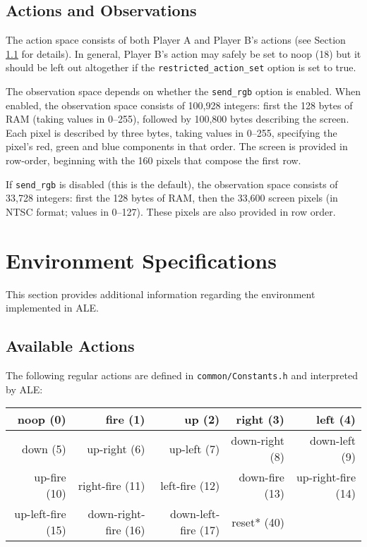 \documentclass[12pt]{article}
\begin{document}
\subsection{Actions and Observations}

The action space consists of both Player A and Player B's actions (see Section 
\ref{sec:available_actions}
for details). In general, Player B's action may safely be set to noop (18) but it should be left out
altogether if the \verb+restricted_action_set+ option is set to true. 

The observation space depends on whether the \verb+send_rgb+ option is enabled. 
 When enabled, the observation space consists of 100,928 
 integers: first the 128 bytes of RAM (taking values in 0--255), followed by 100,800 bytes 
 describing the screen.
 Each pixel is described by three bytes, taking values in 0--255, specifying the pixel's 
 red, green and blue components in that order. The screen is provided in row-order, 
beginning with the 160 pixels that compose the first row.
 
If \verb+send_rgb+ is disabled (this is the default), the observation space consists of 33,728 integers: first the 128 bytes of RAM, then the 33,600 screen pixels (in NTSC format; values in 0--127).
These pixels are also provided in row order.

\section{Environment Specifications}\label{sec:environment_specifications}

This section provides additional information regarding the environment implemented in ALE.

\subsection{Available Actions}\label{sec:available_actions}

The following regular actions are defined in \verb+common/Constants.h+ and interpreted by ALE:

\begin{center}
\small{
\begin{tabular}{|r|r|r|r|r|}
\hline
noop (0) & fire (1) & up (2) & right (3) & left (4) \\
\hline
down (5) & up-right (6) & up-left (7) & down-right (8) & down-left (9) \\
\hline
up-fire (10) & right-fire (11) & left-fire (12) & down-fire (13) & up-right-fire (14) \\
\hline
up-left-fire (15) & down-right-fire (16) & down-left-fire (17) & reset* (40) & \\
\hline
\end{tabular}
}
\end{center}
\end{document}
